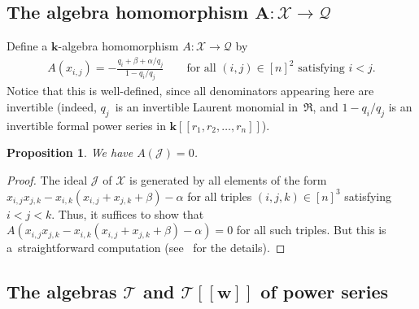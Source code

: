 \documentclass[11pt]{article}
\newtheorem{Proposition}[Theorem]{Proposition}
\numberwithin{equation}{section}
\begin{document}
\subsection[The algebra homomorphism $A\colon \mathcal{X}\rightarrow\mathcal{Q}$]{The algebra homomorphism $\boldsymbol{A\colon \mathcal{X}\rightarrow\mathcal{Q}}$}

\begin{Definition}\label{def.A}Define a $\mathbf{k}$-algebra homomorphism $A\colon \mathcal{X}\rightarrow\mathcal{Q}$ by
\begin{gather*}
A ( x_{i,j} ) =-\frac{q_{i}+\beta+\alpha/q_{j}}{1-q_{i}/q_{j}}\qquad \text{for all }(i,j) \in[n] ^{2}\text{ satisfying }i<j.
\end{gather*}
Notice that this is well-defined, since all denominators appearing here are invertible (indeed, $q_{j}$~is an invertible Laurent monomial in~$\mathfrak{R}$, and $1-q_{i}/q_{j}$ is an invertible formal power series in
$\mathbf{k} [[ r_{1},r_{2},\ldots,r_{n} ] ] $).
\end{Definition}

\begin{Proposition}\label{prop.A.killsJ}We have $A ( \mathcal{J} ) =0$.
\end{Proposition}

\begin{proof}The ideal $\mathcal{J}$ of $\mathcal{X}$ is generated by all elements of the form $x_{i,j}x_{j,k}-x_{i,k} ( x_{i,j}+x_{j,k}+\beta ) -\alpha$ for all triples
$(i,j,k) \in[n] ^{3}$ satisfying $i<j<k$. Thus, it suffices to show that $A ( x_{i,j}x_{j,k}-x_{i,k} ( x_{i,j}+x_{j,k}+\beta ) -\alpha ) =0$ for all such triples. But this is a~straightforward computation (see~\cite{verlong} for the details).
\end{proof}

\subsection[The algebras $\mathcal{T}$ and $\protect{\mathcal{T}[[w]]}$ of power series]{The algebras $\boldsymbol{\mathcal{T}}$ and $\boldsymbol{\mathcal{T}[[w]]}$ of power series}
\end{document}
